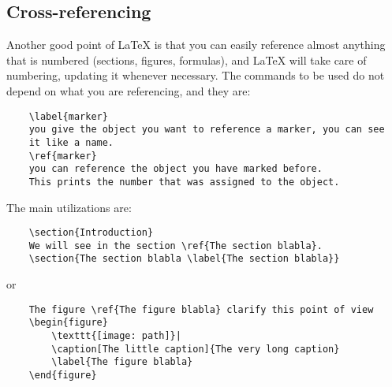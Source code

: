 \documentclass[a4paper, 12pt, oneside]{report}
\begin{document}
\subsection{Cross-referencing}
Another good point of LaTeX is that you can easily reference almost anything that is numbered (sections, figures, formulas), and LaTeX will take care of numbering, updating it whenever necessary. The commands to be used do not depend on what you are referencing, and they are:
\begin{verbatim}
	\label{marker}
	you give the object you want to reference a marker, you can see
	it like a name.
	\ref{marker}
	you can reference the object you have marked before.
	This prints the number that was assigned to the object.
\end{verbatim}
The main utilizations are:
\begin{verbatim}
	\section{Introduction}
	We will see in the section \ref{The section blabla}.
	\section{The section blabla \label{The section blabla}}
\end{verbatim}
or
\begin{verbatim}
	The figure \ref{The figure blabla} clarify this point of view
	\begin{figure}
	    \texttt{[image: path]}|
	    \caption[The little caption]{The very long caption}
	    \label{The figure blabla}
	\end{figure}
\end{verbatim}
\end{document}
